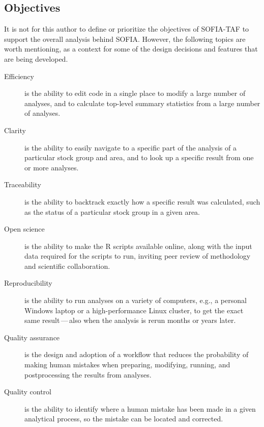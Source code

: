 \documentclass[12pt]{article}
\begin{document}
\subsection{Objectives}

It is not for this author to define or prioritize the objectives of SOFIA-TAF to
support the overall analysis behind SOFIA. However, the following topics are
worth mentioning, as a context for some of the design decisions and features
that are being developed.\\[-1.5ex]

\begin{description}
  \item[Efficiency] is the ability to edit code in a single place to modify a
  large number of analyses, and to calculate top-level summary statistics from a
  large number of analyses.\\[-2.5ex]
  \item[Clarity] is the ability to easily navigate to a specific part of the
  analysis of a particular stock group and area, and to look up a specific
  result from one or more analyses.\\[-2.5ex]
  \item[Traceability] is the ability to backtrack exactly how a specific result
  was calculated, such as the status of a particular stock group in a given
  area.\\[-2.5ex]
  \item[Open science] is the ability to make the R scripts available online,
  along with the input data required for the scripts to run, inviting peer
  review of methodology and scientific collaboration.\\[-2.5ex]
  \newpage
  \item[Reproducibility] is the ability to run analyses on a variety of
  computers, e.g., a personal Windows laptop or a high-performance Linux
  cluster, to get the exact same result$\,$---$\,$also when the analysis is
  rerun months or years later.\\[-2.5ex]
  \item[Quality assurance] is the design and adoption of a workflow that reduces
  the probability of making human mistakes when preparing, modifying, running,
  and postprocessing the results from analyses.\\[-2.5ex]
  \item[Quality control] is the ability to identify where a human mistake has
  been made in a given analytical process, so the mistake can be located and
  corrected.\\[-1.5ex]
\end{description}
\end{document}
